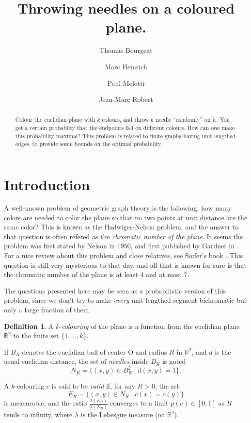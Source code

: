 \documentclass[a4paper,11pt]{article}
\title{Throwing needles on a coloured plane.}
\author{Thomas Bourgeat \and Marc Heinrich \and Paul Melotti 
\and Jean-Marc Robert}
\theoremstyle{definition}
\newtheorem{definition}{Definition}
\theoremstyle{remark}
\begin{document}
\maketitle

\begin{abstract} Colour the euclidian plane with $k$ colours, and throw a needle
``randomly'' on it. You get a certain probablity that the endpoints fall on 
different colours. How can one make this probability maximal?
This problem is related to finite graphs having unit-lengthed edges, to provide 
some bounds on the optimal probability.\end{abstract}

\section{Introduction}
A well-known problem of geometric graph theory is the following: how many colors
are needed to color the plane so that no two points at unit distance are the 
same color? This is known as the Hadwiger-Nelson problem, and the answer to that
question is often refered as the \textit{chromatic number of the plane}. It 
seems the problem was first stated by Nelson in 1950, and first published by 
Gardner in \cite{gardner}.
For a nice review about this problem and close relatives, see Soifer's book
\cite{soifer}. This question is still very mysterious to that day, and all that 
is known for sure is that the chromatic number of the plane is at least 4 and at
most 7.

The questions presented here may be seen as a probabilistic version of this 
problem, since we don't try to make \textit{every} unit-lengthed segment 
bichromatic but only a large fraction of them.
\begin{definition}
A $k$-\textit{colouring} of the plane is a function from the euclidian 
plane~$\mathbb{R} ^2$ to the finite set $\{1, \dots , k \}$.

If $B_R$ denotes the euclidian ball of center O and radius $R$ in 
$\mathbb{R} ^2$, and $d$ is the usual euclidian distance, the set of
\textit{needles} inside $B_R$ is noted
\[N_R = \{(x,y) \in B_R ^2 \mid d(x,y)=1\}. \]

A $k$-colouring $c$ is said to be \textit{valid} if, for any $R>0$, the set
\[ E_R = \{(x,y) \in N_R \mid c(x) = c(y) \} \]
is measurable, and the ratio $\frac{\lambda (E_R)}{\lambda (N_R)}$ 
converges to a limit $p(c) \in [0,1]$ as $R$ tends to infinity, where $\lambda$ 
is the Lebesgue measure (on $\mathbb{R}^4$).
\end{definition}
\end{document}
